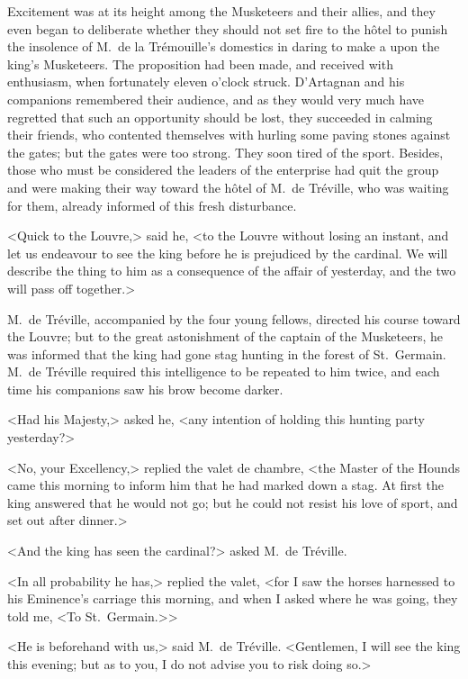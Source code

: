 Excitement was at its height among the Musketeers and their allies, and they even began to deliberate whether they should not set fire to the hôtel to punish the insolence of M.~de la Trémouille's domestics in daring to make a  upon the king's Musketeers. The proposition had been made, and received with enthusiasm, when fortunately eleven o'clock struck. D'Artagnan and his companions remembered their audience, and as they would very much have regretted that such an opportunity should be lost, they succeeded in calming their friends, who contented themselves with hurling some paving stones against the gates; but the gates were too strong. They soon tired of the sport. Besides, those who must be considered the leaders of the enterprise had quit the group and were making their way toward the hôtel of M.~de Tréville, who was waiting for them, already informed of this fresh disturbance. 

<Quick to the Louvre,> said he, <to the Louvre without losing an instant, and let us endeavour to see the king before he is prejudiced by the cardinal. We will describe the thing to him as a consequence of the affair of yesterday, and the two will pass off together.> 

M.~de Tréville, accompanied by the four young fellows, directed his course toward the Louvre; but to the great astonishment of the captain of the Musketeers, he was informed that the king had gone stag hunting in the forest of St.~Germain. M.~de Tréville required this intelligence to be repeated to him twice, and each time his companions saw his brow become darker. 

<Had his Majesty,> asked he, <any intention of holding this hunting party yesterday?> 

<No, your Excellency,> replied the valet de chambre, <the Master of the Hounds came this morning to inform him that he had marked down a stag. At first the king answered that he would not go; but he could not resist his love of sport, and set out after dinner.> 

<And the king has seen the cardinal?> asked M.~de Tréville. 

<In all probability he has,> replied the valet, <for I saw the horses harnessed to his Eminence's carriage this morning, and when I asked where he was going, they told me, <To St.~Germain.>> 

<He is beforehand with us,> said M.~de Tréville. <Gentlemen, I will see the king this evening; but as to you, I do not advise you to risk doing so.> 

